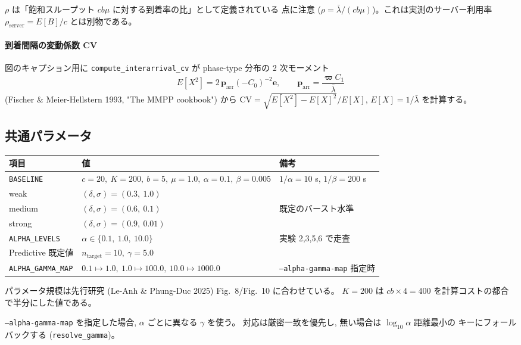 \documentclass[a4paper,11pt]{article}
\newcommand{\code}[1]{\texttt{#1}}
\begin{document}
$\rho$ は「飽和スループット $cb\mu$ に対する到着率の比」として定義されている
点に注意 ($\rho=\bar\lambda/(cb\mu)$)。これは実測のサーバー利用率
$\rho_{\mathrm{server}}=E[B]/c$ とは別物である。

\paragraph{到着間隔の変動係数 CV}
図のキャプション用に \code{compute\_interarrival\_cv} が
phase-type 分布の 2 次モーメント
\begin{equation}
  E[X^2]=2\,\boldsymbol{p}_{\mathrm{arr}}(-C_0)^{-2}\mathbf{e},\qquad
  \boldsymbol{p}_{\mathrm{arr}}=\frac{\boldsymbol{\varpi}C_1}{\bar\lambda}
\end{equation}
(Fischer \& Meier-Hellstern 1993, "The MMPP cookbook") から
$\mathrm{CV}=\sqrt{E[X^2]-E[X]^2}/E[X]$, $E[X]=1/\bar\lambda$ を計算する。

\subsection{共通パラメータ}

\begin{center}
\begin{tabular}{lll}
\toprule
項目 & 値 & 備考 \\
\midrule
\code{BASELINE} & $c=20,\ K=200,\ b=5,\ \mu=1.0,\ \alpha=0.1,\ \beta=0.005$
  & $1/\alpha=10$ s, $1/\beta=200$ s \\
weak   & $(\delta,\sigma)=(0.3,\ 1.0)$ & \\
medium & $(\delta,\sigma)=(0.6,\ 0.1)$ & 既定のバースト水準 \\
strong & $(\delta,\sigma)=(0.9,\ 0.01)$ & \\
\code{ALPHA\_LEVELS} & $\alpha\in\{0.1,\ 1.0,\ 10.0\}$ & 実験 2,3,5,6 で走査 \\
Predictive 既定値 & $n_{\mathrm{target}}=10,\ \gamma=5.0$ & \\
\code{ALPHA\_GAMMA\_MAP} & $0.1\!\mapsto\!1.0,\ 1.0\!\mapsto\!100.0,\ 10.0\!\mapsto\!1000.0$
  & \code{--alpha-gamma-map} 指定時 \\
\bottomrule
\end{tabular}
\end{center}

パラメータ規模は先行研究 (Le-Anh \& Phung-Duc 2025) Fig.~8/Fig.~10 に合わせている。
$K=200$ は $cb\times4=400$ を計算コストの都合で半分にした値である。

\code{--alpha-gamma-map} を指定した場合, $\alpha$ ごとに異なる $\gamma$ を使う。
対応は厳密一致を優先し, 無い場合は $\log_{10}\alpha$ 距離最小の
キーにフォールバックする (\code{resolve\_gamma})。
\end{document}
